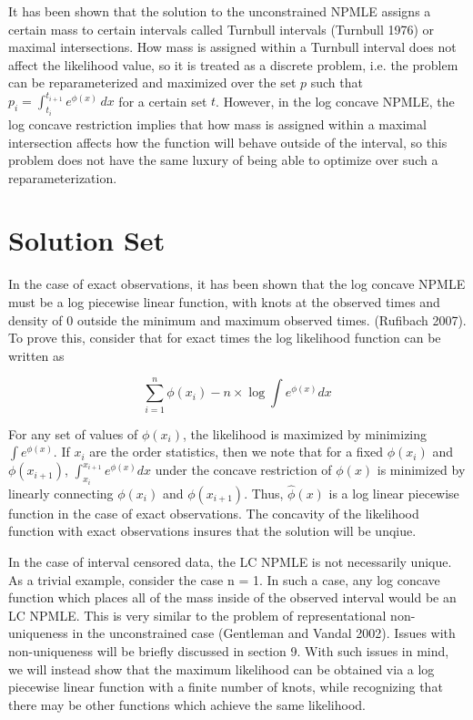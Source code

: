 \documentclass[10pt]{article}
\begin{document}
	It has been shown that the solution to the unconstrained NPMLE assigns a certain mass to certain intervals called Turnbull intervals (Turnbull 1976) or maximal intersections. How mass is assigned within a Turnbull interval does not affect the likelihood value, so it is treated as a discrete problem, i.e. the problem can be reparameterized and maximized over the set $p$ such that $p_i = \int_{t_i}^{t_{i+1}} e^ { \phi(x) } \,dx$  for a certain set $t$. However, in the log concave NPMLE, the log concave restriction implies that how mass is assigned within a maximal intersection affects how the function will behave outside of the interval, so this problem does not have the same luxury of being able to optimize over such a reparameterization.
		
{\section{Solution Set}}

	In the case of exact observations, it has been shown that the log concave NPMLE must be a log piecewise linear function, with knots at the observed times and density of 0 outside the minimum and maximum observed times. (Rufibach 2007). To prove this, consider that for exact times the log likelihood function can be written as
	
	\[ \displaystyle \sum_{i = 1}^n \phi(x_i) - n \times \log \int e^{\phi(x)} dx
	\]
	
	For any set of values of $\phi(x_i)$, the likelihood is maximized by minimizing $\int e^{\phi(x)}$. If $x_i$ are the order statistics, then we note that for a fixed $\phi(x_i)$ and $\phi(x_{i+1})$, $\int_{x_i}^{x_{i+1}} e^{\phi(x)}dx$ under the concave restriction of $\phi(x)$ is minimized by linearly connecting $\phi(x_i)$ and $\phi(x_{i+1})$. Thus, $\hat \phi(x)$ is a log linear piecewise function in the case of exact observations. The concavity of the likelihood function with exact observations insures that the solution will be unqiue.
		
	In the case of interval censored data, the LC NPMLE is not necessarily unique. As a trivial example, consider the case n = 1. In such a case, any log concave function which places all of the mass inside of the observed interval would be an LC NPMLE. This is very similar to the problem of representational non-uniqueness in the unconstrained case (Gentleman and Vandal 2002). Issues with non-uniqueness will be briefly discussed in section 9. With such issues in mind, we will instead show that the maximum likelihood can be obtained via a log piecewise linear function with a finite number of knots, while recognizing that there may be other functions which achieve the same likelihood. 
\end{document}
